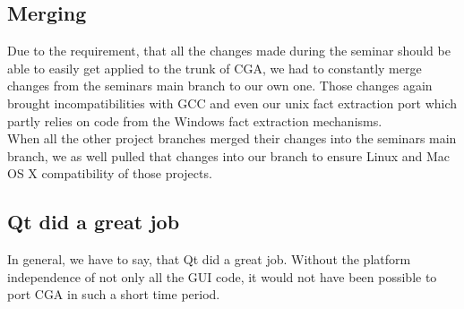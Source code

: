 \subsection{Merging} Due to the requirement, that all the changes made during the seminar should be able to easily get applied to the trunk of CGA, we had to constantly merge changes from the seminars main branch to our own one. Those changes again brought incompatibilities with GCC and even our unix fact extraction port which partly relies on code from the Windows fact extraction mechanisms.\\

When all the other project branches merged their changes into the seminars main branch, we as well pulled that changes into our branch to ensure Linux and Mac OS X compatibility of those projects.

\subsection{Qt did a great job} In general, we have to say, that Qt did a great job. Without the platform independence of not only all the GUI code, it would not have been possible to port CGA in such a short time period. 
